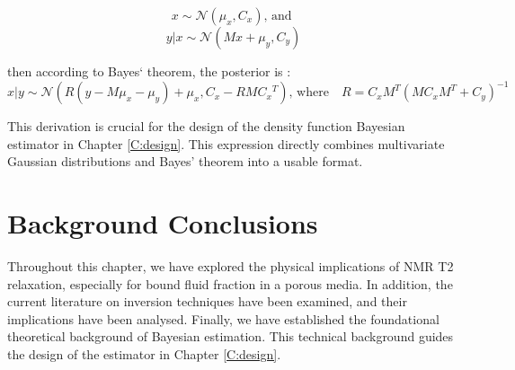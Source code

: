 \begin{equation}
x \sim 	\mathcal{N} (\mu_x, C_x) \text{, and }
\end{equation}
\begin{equation}
y|x \sim \mathcal{N}(Mx + \mu_y, C_y)
\end{equation}

then according to Bayes` theorem, the posterior is \cite{mv_bayes_thm_result}:
\begin{equation}
    x|y \sim \mathcal{N}(R(y - M\mu_x - \mu_y) + \mu_x, C_x - RMC{_x}^T)   \text{, where} \quad R = C_x M^T (MC_xM^T + C_y)^{-1}
    \label{eq:bayes_multivariate_dist}
\end{equation}

This derivation is crucial for the design of the density function Bayesian estimator in Chapter \ref{C:design}. This expression directly combines multivariate Gaussian distributions and Bayes' theorem into a usable format.

\section{Background Conclusions}
Throughout this chapter, we have explored the physical implications of NMR T2 relaxation, especially for bound fluid fraction in a porous media. In addition, the current literature on inversion techniques have been examined, and their implications have been analysed. Finally, we have established the foundational theoretical background of Bayesian estimation. This technical background guides the design of the estimator in Chapter \ref{C:design}.